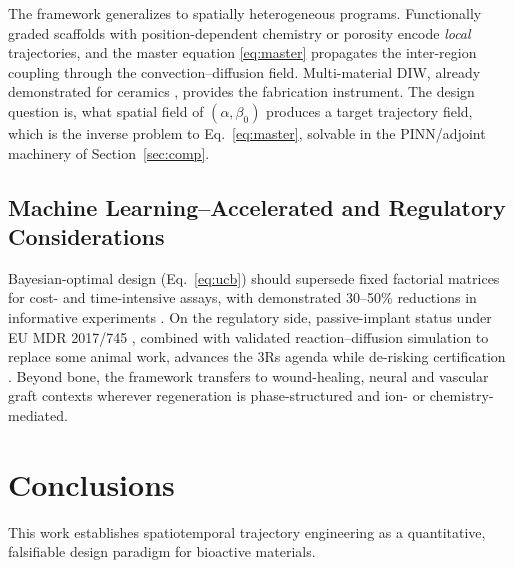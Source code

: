 \documentclass[11pt]{article}
\begin{document}
The framework generalizes to spatially heterogeneous programs. Functionally graded scaffolds with position-dependent chemistry or porosity \cite{Su2025,Lee2023} encode \emph{local} trajectories, and the master equation \eqref{eq:master} propagates the inter-region coupling through the convection--diffusion field. Multi-material DIW, already demonstrated for ceramics \cite{Chamhibrahim2025,Tang2022}, provides the fabrication instrument. The design question is, what spatial field of $(\alpha,\beta_0)$ produces a target trajectory field, which is the inverse problem to Eq.~\eqref{eq:master}, solvable in the PINN/adjoint machinery of Section~\ref{sec:comp}.


\subsection{Machine Learning--Accelerated and Regulatory Considerations}


Bayesian-optimal design (Eq.~\eqref{eq:ucb}) should supersede fixed factorial matrices for cost- and time-intensive assays, with demonstrated 30--50\% reductions in informative experiments \cite{Shahriari2016}. On the regulatory side, passive-implant status under EU MDR 2017/745 \cite{MDR2017}, combined with validated reaction--diffusion simulation to replace some animal work, advances the 3Rs agenda while de-risking certification \cite{Workie2025b}. Beyond bone, the framework transfers to wound-healing, neural and vascular graft contexts wherever regeneration is phase-structured and ion- or chemistry-mediated.


\section{Conclusions}
\label{sec:concl}

This work establishes spatiotemporal trajectory engineering as a quantitative, falsifiable design paradigm for bioactive materials.
\end{document}

